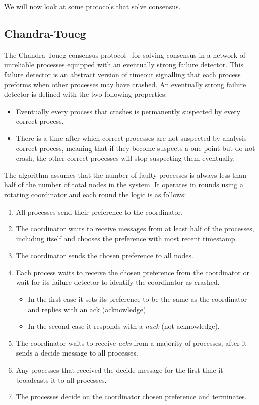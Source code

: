 We will now look at some protocols that solve consensus.

\subsection{Chandra-Toueg}\label{sub:chandra-toueg}

The Chandra-Toueg consensus protocol~\cite{chandra} for solving consensus in a network of
unreliable processes equipped with an eventually strong failure detector.
This failure detector is an abstract version of timeout signalling that each
process preforms when other processes may have crashed.
An eventually strong failure detector is defined with the two following properties:
\begin{itemize}
  \item Eventually every process that crashes is permanently suspected by every
correct process.
  \item There is a time after which correct processes are not suspected by analysis
correct process, meaning that if they become suspects a one point but do not crash,
the other correct processes will stop suspecting them eventually.
\end{itemize}

The algorithm assumes that the number of faulty processes is always less than half
of the number of total nodes in the system. It operates in rounds using a rotating
coordinator and each round the logic is as follows:

\begin{enumerate}
  \item All processes send their preference to the coordinator.
  \item The coordinator waits to receive messages from at least half of the processes,
including itself and chooses the preference with most recent timestamp.
  \item The coordinator sends the chosen preference to all nodes.
  \item Each process waits to receive the chosen preference from the coordinator
or wait for its failure detector to identify the coordinator as crashed.
  \begin{itemize}
    \item In the first case it sets its preference to be the same as the coordinator
and replies with an ack (acknowledge).
    \item In the second case it responds with a \textit{nack} (not acknowledge).
  \end{itemize}
  \item The coordinator waits to receive \textit{acks} from a majority of processes, after
it sends a decide message to all processes.
  \item Any processes that received the decide message for the first time it
broadcasts it to all processes.
  \item The processes decide on the coordinator chosen preference and terminates.
\end{enumerate}

